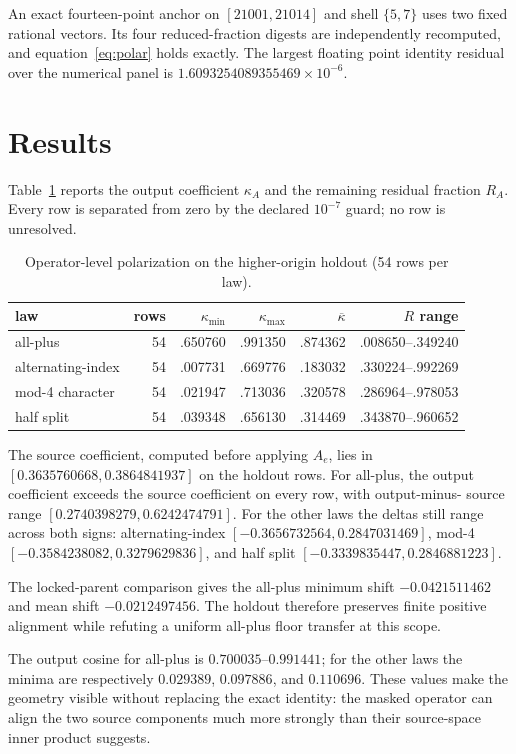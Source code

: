 \documentclass[10pt]{article}
\begin{document}
An exact fourteen-point anchor on $[21001,21014]$ and shell $\{5,7\}$ uses two
fixed rational vectors.  Its four reduced-fraction digests are independently
recomputed, and equation~\eqref{eq:polar} holds exactly.  The largest floating
point identity residual over the numerical panel is
$1.6093254089355469\times10^{-6}$.

\section{Results}

Table~\ref{tab:summary} reports the output coefficient $\kappa_A$ and the
remaining residual fraction $R_A$.  Every row is separated from zero by the
declared $10^{-7}$ guard; no row is unresolved.

\begin{table}[h]
\centering\small
\caption{Operator-level polarization on the higher-origin holdout (54 rows per law).}
\label{tab:summary}
\begin{tabular}{lrrrrr}
\toprule
law & rows & $\kappa_{\min}$ & $\kappa_{\max}$ & $\overline\kappa$ & $R$ range\\
\midrule
all-plus & 54 & .650760 & .991350 & .874362 & .008650--.349240\\
alternating-index & 54 & .007731 & .669776 & .183032 & .330224--.992269\\
mod-4 character & 54 & .021947 & .713036 & .320578 & .286964--.978053\\
half split & 54 & .039348 & .656130 & .314469 & .343870--.960652\\
\bottomrule
\end{tabular}
\end{table}

The source coefficient, computed before applying $A_e$, lies in
$[0.3635760668,0.3864841937]$ on the holdout rows.  For all-plus, the output
coefficient exceeds the source coefficient on every row, with output-minus-
source range $[0.2740398279,0.6242474791]$.  For the other laws the deltas
still range across both signs: alternating-index
$[-0.3656732564,0.2847031469]$, mod-4
$[-0.3584238082,0.3279629836]$, and half split
$[-0.3339835447,0.2846881223]$.

The locked-parent comparison gives the all-plus minimum shift
$-0.0421511462$ and mean shift $-0.0212497456$.  The holdout therefore
preserves finite positive alignment while refuting a uniform all-plus floor
transfer at this scope.

The output cosine for all-plus is $0.700035$--$0.991441$; for the other laws
the minima are respectively $0.029389$, $0.097886$, and $0.110696$.
These values make the geometry visible without replacing the exact identity:
the masked operator can align the two source components much more strongly
than their source-space inner product suggests.
\end{document}
